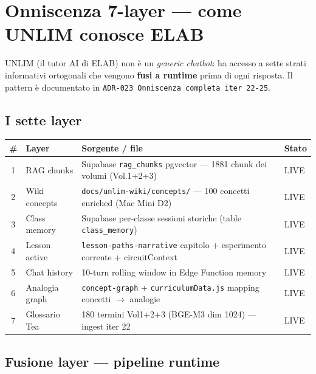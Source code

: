 \documentclass[12pt,a4paper]{article}
\begin{document}
\newpage

\section{Onniscenza 7-layer --- come UNLIM conosce ELAB}

UNLIM (il tutor AI di ELAB) non è un \emph{generic chatbot}: ha accesso a sette strati informativi
ortogonali che vengono \textbf{fusi a runtime} prima di ogni risposta.
Il pattern è documentato in \texttt{ADR-023 Onniscenza completa iter 22-25}.

\subsection{I sette layer}

\begin{center}
\renewcommand{\arraystretch}{1.3}
\begin{tabular}{c p{3.2cm} p{6.5cm} p{2.5cm}}
\toprule
\textbf{\#} & \textbf{Layer} & \textbf{Sorgente / file} & \textbf{Stato} \\
\midrule
1 & RAG chunks & Supabase \texttt{rag\_chunks} pgvector --- 1881 chunk dei volumi (Vol.1+2+3) & LIVE \\
2 & Wiki concepts & \texttt{docs/unlim-wiki/concepts/} --- 100 concetti enriched (Mac Mini D2) & LIVE \\
3 & Class memory & Supabase per-classe sessioni storiche (table \texttt{class\_memory}) & LIVE \\
4 & Lesson active & \texttt{lesson-paths-narrative} capitolo + esperimento corrente + circuitContext & LIVE \\
5 & Chat history & 10-turn rolling window in Edge Function memory & LIVE \\
6 & Analogia graph & \texttt{concept-graph} + \texttt{curriculumData.js} mapping concetti $\rightarrow$ analogie & LIVE \\
7 & Glossario Tea & 180 termini Vol1+2+3 (BGE-M3 dim 1024) --- ingest iter 22 & LIVE \\
\bottomrule
\end{tabular}
\end{center}

\subsection{Fusione layer --- pipeline runtime}
\end{document}
